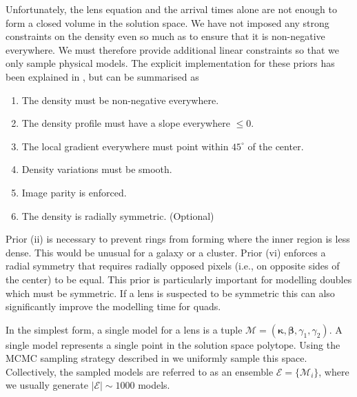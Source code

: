 \documentclass[galley,usenatbib]{mn2e}
\newcommand{\M}{\ensuremath{\mathscr{M}}}
\newcommand{\E}{\ensuremath{\mathscr{E}}}
\renewcommand{\vec}[1]{\ensuremath{\boldsymbol{#1}}}
\begin{document}
Unfortunately, the lens equation and the arrival times alone are not enough to form a
closed volume in the solution space. We have not imposed any strong constraints
on the density even so much as to ensure that it is non-negative everywhere. We
must therefore provide additional linear constraints so that we only sample
physical models. The explicit implementation for these priors has been
explained in \cite{2008ApJ...679...17C}, but can be summarised as
\begin{enumerate}
\item The density must be non-negative everywhere.
\item The density profile must have a slope everywhere $\le 0$.
\item The local gradient everywhere must point within $45^{\circ}$ of the center.
\item Density variations must be smooth.
\item Image parity is enforced.
\item The density is radially symmetric. (Optional)
\end{enumerate}

Prior (ii) is necessary to prevent rings from forming where the inner region is
less dense. This would be unusual for a galaxy or a cluster. Prior (vi)
enforces a radial symmetry that requires radially opposed pixels (i.e., on
opposite sides of the center) to be equal. This prior is particularly important
for modelling doubles which must be symmetric. If a lens is suspected to be
symmetric this can also significantly improve the modelling time for quads.

In the simplest form, a single model for a lens is a tuple $\M = (\vec\kappa,
\vec\beta, \gamma_1, \gamma_2)$. A single model represents a single point in the
solution space polytope. Using the MCMC sampling strategy described in \cite{2012MNRAS.425.3077L}
we uniformly sample this space. Collectively, the sampled models are referred
to as an ensemble $\E = \{\M_i\}$, where we usually generate $|\E| \sim 1000$ models.
\end{document}
